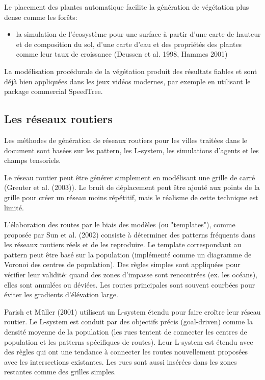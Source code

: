 \documentclass[11pt]{article}
\begin{document}
Le placement des plantes automatique facilite la génération de végétation plus dense comme les forêts:
\begin{itemize}
\item la simulation de l'écosystème pour une surface à partir d'une carte de hauteur et de composition du sol, d'une carte d'eau et des propriétés des plantes comme leur taux de croissance (Deussen et al. 1998, Hammes 2001)\newline
\end{itemize}

La modélisation procédurale de la végétation produit des résultats fiables et sont déjà bien appliquées dans les jeux vidéos modernes, par exemple en utilisant le package commercial SpeedTree.

\subsection*{Les réseaux routiers}

Les méthodes de génération de réseaux routiers pour les villes traitées dans le document sont basées sur les pattern, les L-system, les simulations d'agents et les champs tensoriels. 

Le réseau routier peut être générer simplement en modélisant une grille de carré (Greuter et al. (2003)). Le bruit de déplacement peut être ajouté aux points de la grille pour créer un réseau moins répétitif, mais le réalisme de cette technique est limité. 

L'élaboration des routes par le biais des modèles (ou "templates"), comme proposée par Sun et al. (2002) consiste à déterminer des patterns fréquents dans les réseaux routiers réels et de les reproduire. Le template correspondant au pattern peut être basé sur la population (implémenté comme un diagramme de Voronoi des centres de population). Des règles simples sont appliquées pour vérifier leur validité: quand des zones d'impasse sont rencontrées (ex. les océans), elles sont annulées ou déviées. Les routes principales sont souvent courbées pour éviter les gradients d'élévation large.

Parish et Müller (2001) utilisent un L-system étendu pour faire croître leur réseau routier. Le L-system est conduit par des objectifs précis (goal-driven) comme la densité moyenne de la population (les rues tentent de connecter les centres de population et les patterns spécifiques de routes). Leur L-system est étendu avec des règles qui ont une tendance à connecter les routes nouvellement proposées avec les intersections existantes. Les rues sont aussi insérées dans les zones restantes comme des grilles simples. \newline
\end{document}
